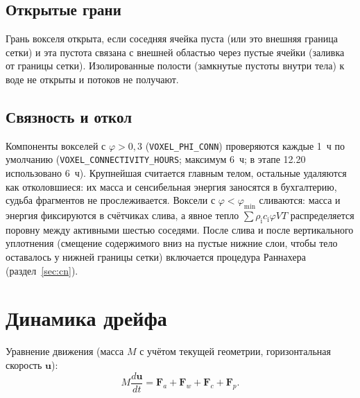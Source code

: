 \documentclass[12pt,a4paper]{article}
\newcommand{\rhoi}{\rho_{\mathrm i}}
\newcommand{\ci}{c_{\mathrm i}}
\newcommand{\code}[1]{\texttt{\small #1}}
\begin{document}
\subsection{Открытые грани}\label{sec:open}
Грань вокселя открыта, если соседняя ячейка пуста (или это внешняя граница сетки) и эта пустота связана с внешней областью через пустые ячейки (заливка от границы сетки). Изолированные полости (замкнутые пустоты внутри тела) к воде не открыты и потоков не получают.

\subsection{Связность и откол}\label{sec:flush}
Компоненты вокселей с $\varphi>0{,}3$ (\code{VOXEL\_PHI\_CONN}) проверяются каждые 1~ч по умолчанию (\code{VOXEL\_CONNECTIVITY\_HOURS}; максимум 6~ч; в этапе 12.20 использовано 6~ч). Крупнейшая считается главным телом, остальные удаляются как отколовшиеся: их масса и сенсибельная энергия заносятся в бухгалтерию, судьба фрагментов не прослеживается. Воксели с $\varphi<\varphi_{\min}$ сливаются: масса и энергия фиксируются в счётчиках слива, а явное тепло $\sum\rhoi\ci\varphi V T$ распределяется поровну между активными шестью соседями. После слива и после вертикального уплотнения (смещение содержимого вниз на пустые нижние слои, чтобы тело оставалось у нижней границы сетки) включается процедура Раннахера (раздел~\ref{sec:cn}).

\section{Динамика дрейфа}\label{sec:dyn}

Уравнение движения (масса $M$ с учётом текущей геометрии, горизонтальная скорость $\mathbf u$):
\begin{equation}
M\frac{d\mathbf u}{dt}=\mathbf F_a+\mathbf F_w+\mathbf F_c+\mathbf F_p .
\end{equation}
\end{document}
